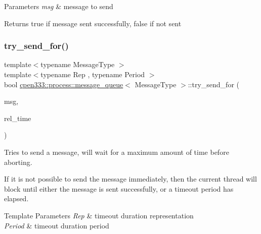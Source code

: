 \begin{DoxyParams}{Parameters}
{\em msg} & message to send \\
\hline
\end{DoxyParams}
\begin{DoxyReturn}{Returns}
{\ttfamily true} if message sent successfully, {\ttfamily false} if not sent 
\end{DoxyReturn}
\mbox{\label{classcpen333_1_1process_1_1message__queue_a5242a6193a42e68e36634846f09c5e3b}} 
\subsubsection{\texorpdfstring{try\+\_\+send\+\_\+for()}{try\_send\_for()}}
{\footnotesize\ttfamily template$<$typename Message\+Type $>$ \\
template$<$typename Rep , typename Period $>$ \\
bool \hyperlink{classcpen333_1_1process_1_1message__queue}{cpen333\+::process\+::message\+\_\+queue}$<$ Message\+Type $>$\+::try\+\_\+send\+\_\+for (\begin{DoxyParamCaption}\item[{const Message\+Type \&}]{msg,  }\item[{std\+::chrono\+::duration$<$ Rep, Period $>$ \&}]{rel\+\_\+time }\end{DoxyParamCaption})\hspace{0.3cm}{\ttfamily [inline]}}



Tries to send a message, will wait for a maximum amount of time before aborting. 

If it is not possible to send the message immediately, then the current thread will block until either the message is sent successfully, or a timeout period has elapsed.


\begin{DoxyTemplParams}{Template Parameters}
{\em Rep} & timeout duration representation \\
\hline
{\em Period} & timeout duration period \\
\hline
\end{DoxyTemplParams}

